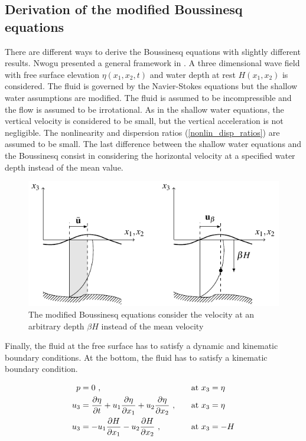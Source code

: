 


\subsection{Derivation of the modified Boussinesq equations}

There are different ways to derive the Boussinesq equations with slightly different results. Nwogu presented a general framework in \cite{nwogu1993}. A three dimensional wave field with free surface elevation $\eta(x_1, x_2, t)$ and water depth at rest $H(x_1, x_2)$ is considered. The fluid is governed by the Navier-Stokes equations but the shallow water assumptions are modified. The fluid is assumed to be incompressible and the flow is assumed to be irrotational. As in the shallow water equations, the vertical velocity is considered to be small, but the vertical acceleration is not negligible. The nonlinearity and dispersion ratios (\ref{nonlin_disp_ratios}) are assumed to be small. The last difference between the shallow water equations and the Boussinesq consist in considering the horizontal velocity at a specified water depth instead of the mean value.

\begin{figure}
    \centering
    \includegraphics[width=.9\textwidth]{img/eq/velocity_beta.pdf}
    \caption{The modified Boussinesq equations consider the velocity at an arbitrary depth $\beta H$ instead of the mean velocity}
\end{figure}

Finally, the fluid at the free surface has to satisfy a dynamic and kinematic boundary conditions. At the bottom, the fluid has to satisfy a kinematic boundary condition.

\begin{equation}\label{dyn_kyn_bc}
\begin{aligned}
p &= 0 \ , \quad &&\text{at } x_3=\eta \\
u_3 &= \frac{\partial\eta}{\partial t} + u_1 \frac{\partial\eta}{\partial x_1}  + u_2 \frac{\partial\eta}{\partial x_2} \ , \quad &&\text{at } x_3=\eta \\
u_3 &= -u_1 \frac{\partial H}{\partial x_1} -u_2 \frac{\partial H}{\partial x_2} \ , \quad &&\text{at } x_3=-H
\end{aligned}
\end{equation}

